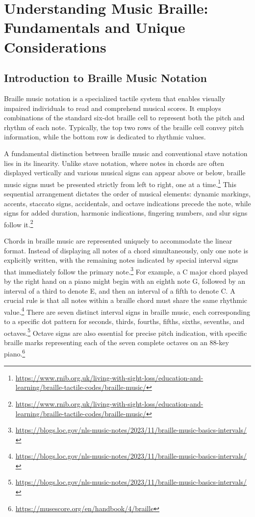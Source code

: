 \section{Understanding Music Braille: Fundamentals and Unique Considerations}

\subsection{Introduction to Braille Music Notation}
Braille music notation is a specialized tactile system that enables visually impaired individuals to read and comprehend musical scores. It employs combinations of the standard six-dot braille cell to represent both the pitch and rhythm of each note. Typically, the top two rows of the braille cell convey pitch information, while the bottom row is dedicated to rhythmic values.\cite{RNIBBrailleMusic}

A fundamental distinction between braille music and conventional stave notation lies in its linearity. Unlike stave notation, where notes in chords are often displayed vertically and various musical signs can appear above or below, braille music signs must be presented strictly from left to right, one at a time.\footnote{\url{https://www.rnib.org.uk/living-with-sight-loss/education-and-learning/braille-tactile-codes/braille-music/}} This sequential arrangement dictates the order of musical elements: dynamic markings, accents, staccato signs, accidentals, and octave indications precede the note, while signs for added duration, harmonic indications, fingering numbers, and slur signs follow it.\footnote{\url{https://www.rnib.org.uk/living-with-sight-loss/education-and-learning/braille-tactile-codes/braille-music/}}

Chords in braille music are represented uniquely to accommodate the linear format. Instead of displaying all notes of a chord simultaneously, only one note is explicitly written, with the remaining notes indicated by special interval signs that immediately follow the primary note.\footnote{\url{https://blogs.loc.gov/nls-music-notes/2023/11/braille-music-basics-intervals/}} For example, a C major chord played by the right hand on a piano might begin with an eighth note G, followed by an interval of a third to denote E, and then an interval of a fifth to denote C. A crucial rule is that all notes within a braille chord must share the same rhythmic value.\footnote{\url{https://blogs.loc.gov/nls-music-notes/2023/11/braille-music-basics-intervals/}} There are seven distinct interval signs in braille music, each corresponding to a specific dot pattern for seconds, thirds, fourths, fifths, sixths, sevenths, and octaves.\footnote{\url{https://blogs.loc.gov/nls-music-notes/2023/11/braille-music-basics-intervals/}} Octave signs are also essential for precise pitch indication, with specific braille marks representing each of the seven complete octaves on an 88-key piano.\footnote{\url{https://musescore.org/en/handbook/4/braille}}

